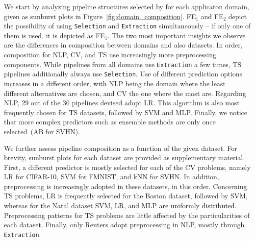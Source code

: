 We start by analyzing pipeline structures selected by \irace for each applicaton domain, given as sunburst plots in Figure~\ref{fig:domain_composition}. FE$_1$ and FE$_2$ depict the possibility of using \texttt{\small Selection} and \texttt{\small Extraction} simultaneously -- if only one of them is used, it is depicted as FE$_1$. 
The two most important insights we observe are the differences in composition between domains and also datasets. 
In order, composition for NLP, CV, and TS use increasingly more preprocessing components. While pipelines from all domains use \texttt{\small Extraction} a few times, TS pipelines additionally always use \texttt{\small Selection}. Use of different prediction options increases in a different order, with NLP being the domain where the least different alternatives are chosen, and CV the one where the most are. Regarding NLP, 29 out of the 30 pipelines devised adopt LR. This algorithm is also most frequently chosen for TS datasets, followed by SVM and MLP. Finally, we notice that more complex predictors such as ensemble methods are only once selected~(AB for SVHN).

We further assess pipeline composition as a function of the given dataset. For brevity, sunburst plots for each dataset are provided as supplementary material. First, a different predictor is mostly selected for each of the CV problems, namely LR for CIFAR-10, SVM for FMNIST, and kNN for SVHN. In addition, preprocessing is increasingly adopted in these datasets, in this order. Concerning TS problems, LR is frequently selected for the Boston dataset, followed by SVM, whereas for the Natal dataset SVM, LR, and MLP are uniformly distributed. Preprocessing patterns for TS problems are little affected by the particularities of each dataset. Finally, only Reuters adopt preprocessing in NLP, mostly through \texttt{\small Extraction}.


